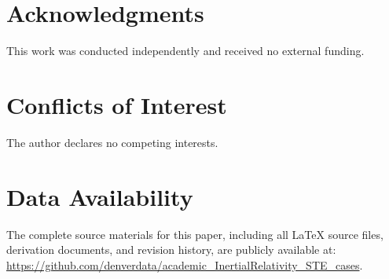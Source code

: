 \documentclass[twoside,twocolumn,9pt,fleqn]{article}
\begin{document}
\section*{Acknowledgments}
This work was conducted independently and received no external funding.

\section*{Conflicts of Interest}
The author declares no competing interests.

\section*{Data Availability}
The complete source materials for this paper, including all \LaTeX{} source files, derivation documents, and revision history, are publicly available at: \url{https://github.com/denverdata/academic_InertialRelativity_STE_cases}.

\balance
\end{document}
